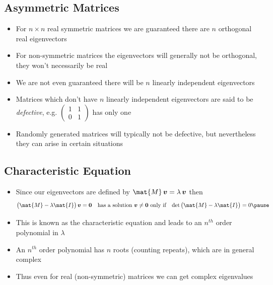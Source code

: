 \begin{slide}
\section[-2]{Asymmetric Matrices}

\begin{PauseHighLight}
  \begin{itemize}\squeeze
  \item For $n\times n$ real symmetric matrices we are guaranteed there are
    $n$ orthogonal real eigenvectors\pause
  \item For non-symmetric matrices the eigenvectors will generally not
    be orthogonal, they won't necessarily be real\pause
  \item We are not even guaranteed there will be $n$ linearly
    independent eigenvectors\pause
  \item Matrices which don't have $n$ linearly independent
    eigenvectors are said to be \emph{defective}, e.g.{}
    $\begin{pmatrix} 1 & 1 \\ 0 & 1 \end{pmatrix}$ has only one\pause
  \item Randomly generated matrices will typically not be defective,
    but nevertheless they can arise in certain situations\pause
  \end{itemize}
\end{PauseHighLight}

\end{slide}


\begin{slide}
\section{Characteristic Equation}

\begin{PauseHighLight}
  \begin{itemize}
  \item Since our eigenvectors are defined by  $\mat{M}\,\bm{v} =
    \lambda\,\bm{v}$ then
    \begin{align*}
      \bra{\strut \mat{M}-\lambda\mat{I}} \bm{v} &= \bm{0}
      & &\text{has a solution $\bm{v}\neq\bm{0}$ only if} &
      \det\bra{\strut \mat{M}-\lambda\mat{I}} = 0\pause
    \end{align*}
  \item This is known as the characteristic equation and leads to an
    $n^{th}$ order polynomial in $\lambda$\pause
  \item An $n^{th}$ order polynomial has $n$ roots (counting repeats),
    which are in general complex\pause
  \item Thus even for real (non-symmetric) matrices we can get complex
    eigenvalues\pause 
  \end{itemize}
\end{PauseHighLight}

\end{slide}

